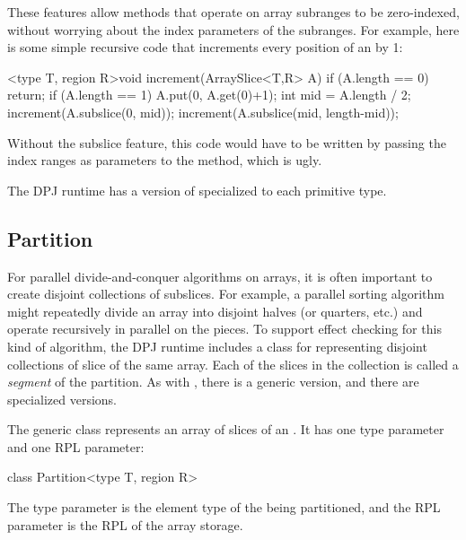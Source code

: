 These features allow methods that operate on array subranges to be
zero-indexed, without worrying about the index parameters of the
subranges.  For example, here is some simple recursive code that
increments every position of an  by 1:
%
\begin{dpjlisting}
<type T, region R>void increment(ArraySlice<T,R> A) {
  if (A.length == 0) return;
  if (A.length == 1) {
    A.put(0, A.get(0)+1);
  }
  int mid = A.length / 2;
  increment(A.subslice(0, mid));
  increment(A.subslice(mid, length-mid));
}
\end{dpjlisting}
%
Without the subslice feature, this code would have to be written by
passing the index ranges as parameters to the  method,
which is ugly.

 The DPJ runtime has a version of
 specialized to each primitive type.

\subsection{Partition%
\label{sec:runtime:partition}}

For parallel divide-and-conquer algorithms on arrays, it is often
important to create disjoint collections of subslices.  For example, a
parallel sorting algorithm might repeatedly divide an array into
disjoint halves (or quarters, etc.) and operate recursively in
parallel on the pieces.  To support effect checking for this kind of
algorithm, the DPJ runtime includes a class  for
representing disjoint collections of slice of the same array.  Each of
the slices in the collection is called a \emph{segment} of the
partition.  As with , there is a generic version, and
there are specialized versions.

  The generic 
class represents an array of slices of an .  It has
one type parameter and one RPL parameter:
%
\begin{dpjlisting}
class Partition<type T, region R>
\end{dpjlisting}
%
The type parameter is the element type of the  being
partitioned, and the RPL parameter is the RPL of the array storage.

